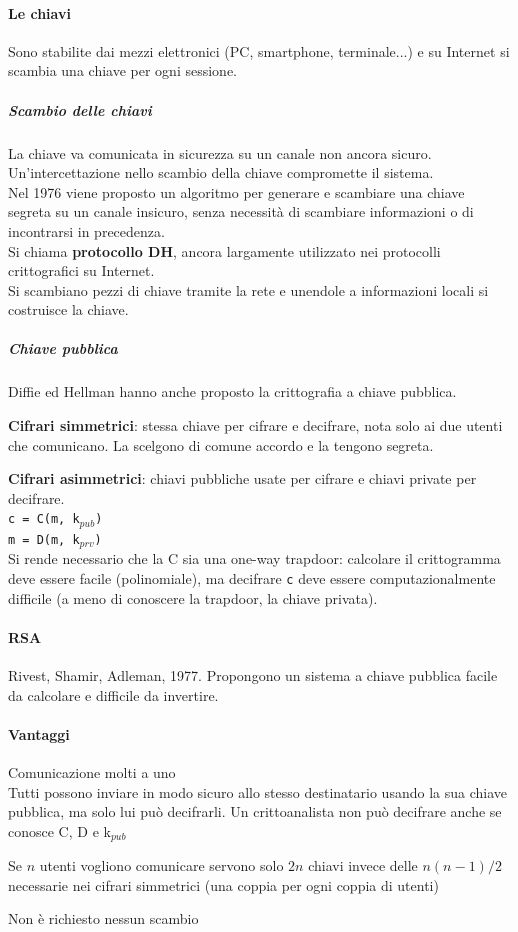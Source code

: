 \documentclass[10pt]{book}
\begin{document}
\paragraph{Le chiavi} Sono stabilite dai mezzi elettronici (PC, smartphone, terminale...) e su Internet si scambia una chiave per ogni sessione.
\subparagraph{Scambio delle chiavi} La chiave va comunicata in sicurezza su un canale non ancora sicuro. Un'intercettazione nello scambio della chiave compromette il sistema.\\
Nel 1976 viene proposto un algoritmo per generare e scambiare una chiave segreta su un canale insicuro, senza necessità di scambiare informazioni o di incontrarsi in precedenza.\\
Si chiama \textbf{protocollo DH}, ancora largamente utilizzato nei protocolli crittografici su Internet.\\
Si scambiano pezzi di chiave tramite la rete e unendole a informazioni locali si costruisce la chiave.
\subparagraph{Chiave pubblica} Diffie ed Hellman hanno anche proposto la crittografia a chiave pubblica.
\begin{list}{}{}
	\item \textbf{Cifrari simmetrici}: stessa chiave per cifrare e decifrare, nota solo ai due utenti che comunicano. La scelgono di comune accordo e la tengono segreta.
	\item \textbf{Cifrari asimmetrici}: chiavi pubbliche usate per cifrare e chiavi private per decifrare.\\
	\texttt{c = C(m, k$_{pub}$)}\\
	\texttt{m = D(m, k$_{prv}$)}\\
	Si rende necessario che la C sia una one-way trapdoor: calcolare il crittogramma deve essere facile (polinomiale), ma decifrare \texttt{c} deve essere computazionalmente difficile (a meno di conoscere la trapdoor, la chiave privata).
\end{list}
\paragraph{RSA} Rivest, Shamir, Adleman, 1977. Propongono un sistema a chiave pubblica facile da calcolare e difficile da invertire.
\paragraph{Vantaggi}
\begin{list}{}{}
	\item Comunicazione molti a uno\\
	Tutti possono inviare in modo sicuro allo stesso destinatario usando la sua chiave pubblica, ma solo lui può decifrarli. Un crittoanalista non può decifrare anche se conosce C, D e k$_{pub}$
	\item Se $n$ utenti vogliono comunicare servono solo $2n$ chiavi invece delle $n(n-1)/2$ necessarie nei cifrari simmetrici (una coppia per ogni coppia di utenti)
	\item Non è richiesto nessun scambio
\end{list}
\end{document}
